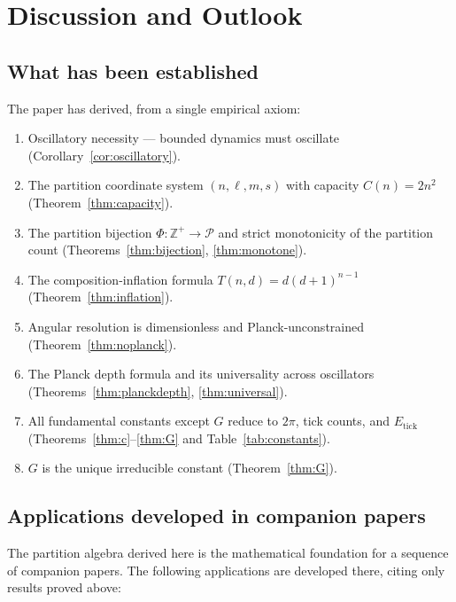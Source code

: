 \documentclass[twocolumn,10pt,a4paper]{article}
\theoremstyle{thmstyle}
\theoremstyle{definition}
\theoremstyle{remark}
\newcommand{\Zp}{\mathbb{Z}^{+}}
\newcommand{\Parts}{\mathcal{P}}
\begin{document}
\section{Discussion and Outlook}
\label{sec:discussion}

\subsection{What has been established}

The paper has derived, from a single empirical axiom:

\begin{enumerate}[nosep,label=(\arabic*)]
\item Oscillatory necessity — bounded dynamics must oscillate
(Corollary~\ref{cor:oscillatory}).
\item The partition coordinate system $(n,\ell,m,s)$ with capacity $C(n) = 2n^2$
(Theorem~\ref{thm:capacity}).
\item The partition bijection $\Phi : \Zp \to \Parts$ and strict monotonicity
of the partition count (Theorems~\ref{thm:bijection}, \ref{thm:monotone}).
\item The composition-inflation formula $T(n,d) = d(d+1)^{n-1}$
(Theorem~\ref{thm:inflation}).
\item Angular resolution is dimensionless and Planck-unconstrained
(Theorem~\ref{thm:noplanck}).
\item The Planck depth formula and its universality across oscillators
(Theorems~\ref{thm:planckdepth}, \ref{thm:universal}).
\item All fundamental constants except $G$ reduce to $2\pi$, tick counts,
and $E_{\mathrm{tick}}$ (Theorems~\ref{thm:c}--\ref{thm:G} and Table~\ref{tab:constants}).
\item $G$ is the unique irreducible constant (Theorem~\ref{thm:G}).
\end{enumerate}

\subsection{Applications developed in companion papers}

The partition algebra derived here is the mathematical foundation for a
sequence of companion papers. The following applications are developed
there, citing only results proved above:
\end{document}
